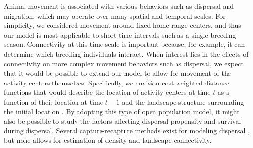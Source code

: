 \documentclass[12pt]{article}
\begin{document}
\begin{spacing}{1.8}
Animal movement is associated with various behaviors such as dispersal and
migration, which may operate over many spatial and temporal
scales. For simplicity, we considered movement around
fixed home range centers, and thus our model is most applicable to
short time intervals such as a single breeding season. %
Connectivity at this time scale is important because, for example,
it can determine which breeding individuals interact. When
interest lies in the effects of connectivity on more complex movement
behaviors such as dispersal, we expect that it
would be possible to extend our model to allow for movement of the
activity centers themselves. Specifically, we envision cost-weighted
distance functions that would describe the location of activity
centers at time $t$ as a function of their location at time $t-1$ and
the landscape structure surrounding the initial location
\citep{gardner_etal:2010ecol}. By adopting
this type of open population model, it might also be possible to study
the factors affecting dispersal propensity and survival during
dispersal. Several capture-recapture methods exist for modeling
dispersal
\citep{kendall_nichols:2004,fujiwara_etal:2006,ovaskainen_etal:2008},
but none
allows for estimation of density and landscape connectivity.

\end{spacing}
\end{document}
